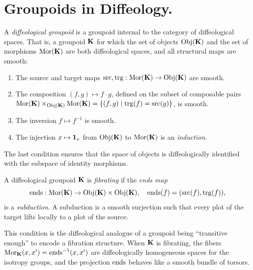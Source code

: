   
  \section{Groupoids in Diffeology.}
  \label{sec:Groupoids in Diffeology}
  
  A \emph{diffeological groupoid} is a groupoid internal to the category of diffeological spaces.
  That is, a groupoid ${\mathbf K}$ for which the set of objects ${\operatorname{Obj}}({\mathbf K})$ and the set of morphisms ${\operatorname{Mor}}({\mathbf K})$ are both diffeological spaces,
  and all structural maps are smooth:
  \begin{enumerate}
    \item The source and target maps $\operatorname{src}, \operatorname{trg}: {\operatorname{Mor}}({\mathbf K}) \to {\operatorname{Obj}}({\mathbf K})$ are smooth.
    \item The composition $(f,g) \mapsto f \cdot g$,
    defined on the subset of composable pairs
    ${\operatorname{Mor}}({\mathbf K}) \times_{{\operatorname{Obj}}({\mathbf K})} {\operatorname{Mor}}({\mathbf K}) = \{ (f,g) \mid \operatorname{trg}(f) = \operatorname{src}(g) \}$,
    is smooth.
    \item The inversion $f \mapsto f^{-1}$ is smooth.
    \item The injection $x \mapsto \boldsymbol{1}_x$ from ${\operatorname{Obj}}({\mathbf K})$ to ${\operatorname{Mor}}({\mathbf K})$ is an \emph{induction}.
  \end{enumerate}
  The last condition ensures that the space of objects is diffeologically identified with the subspace of identity morphisms.
  
  \begin{article}
    A diffeological groupoid ${\mathbf K}$ is \emph{fibrating} if the \emph{ends map}
    \[
      \operatorname{ends}: {\operatorname{Mor}}({\mathbf K}) \to {\operatorname{Obj}}({\mathbf K}) \times {\operatorname{Obj}}({\mathbf K}), \quad
      \operatorname{ends}(f) = (\operatorname{src}(f), \operatorname{trg}(f)),
      \]
    is a \emph{subduction}.
    A subduction is a smooth surjection such that every plot of the target lifts locally to a plot of the source.
    
    This condition is the diffeological analogue of a groupoid being ``transitive enough''
    to encode a fibration structure.
    When ${\mathbf K}$ is fibrating,
    the fibers ${\operatorname{Mor}}_{{\mathbf K}}(x,x') = \operatorname{ends}^{-1}(x,x')$ are diffeologically homogeneous spaces for the isotropy groups,
    and the projection $\operatorname{ends}$ behaves like a smooth bundle of torsors.
  \end{article}
  
